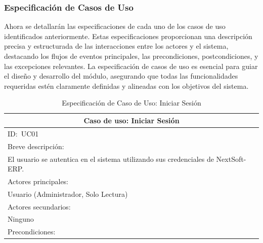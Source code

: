 \documentclass[stu, 12pt, letterpaper, donotrepeattitle, floatsintext, natbib]{apa7}
\begin{document}
\subsubsection{Especificación de Casos de Uso}
Ahora se detallarán las especificaciones de cada uno de los casos de uso identificados anteriormente. Estas especificaciones proporcionan una
descripción precisa y estructurada de las interacciones entre los actores y el sistema, destacando los flujos de eventos principales, las
precondiciones, postcondiciones, y las excepciones relevantes. La especificación de casos de uso es esencial para guiar el diseño y desarrollo
del módulo, asegurando que todas las funcionalidades requeridas estén claramente definidas y alineadas con los objetivos del sistema.
\newline
\begin{longtable}{@{} p{16.5cm} @{}}
    \caption{Especificación de Caso de Uso: Iniciar Sesión}\label{tab:UC01}                                                             \\ \toprule
    \multicolumn{1}{c}{Caso de uso: Iniciar Sesión}                                                                                     \\ \midrule
    ID:~UC01                                                                                                                            \\ \midrule
    Breve descripción:                                                                                                                  \\
    El usuario se autentica en el sistema utilizando sus credenciales de NextSoft-ERP.                                                  \\ \midrule
    Actores principales:                                                                                                                \\
    Usuario (Administrador, Solo Lectura)                                                                                               \\ \midrule
    Actores secundarios:                                                                                                                \\
    Ninguno                                                                                                                             \\ \midrule
    Precondiciones:                                                                                                                     \\

\end{longtable}
\end{document}
